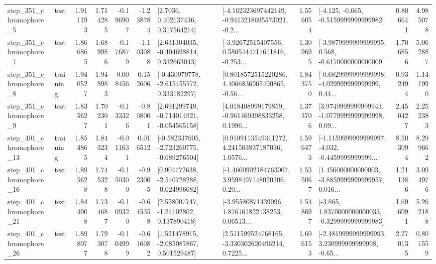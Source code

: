 \begin{tabular}{llrrrrllrlrr}
   step\_351\_chromophore\_5 &      test &      1.911193 &    1.714285 &     -0.196907 & -1.238784 &          [2.7036, 0.402137436, 0.317564214] &  [-4.162323697442149, -0.9413218695573021, -0.2... &       1.556054 &              [-4.125, -0.665, -0.5159999999999982] &            0.806641 &          4.985078 \\
   step\_351\_chromophore\_7 &      test &      1.866865 &    1.689986 &     -0.176879 & -1.103088 &    [2.631304035, -0.404698814, 0.332663043] &  [-3.92672515407556, 0.5805444717611816, -0.253... &       1.309695 &  [-3.9879999999999995, 0.568, -0.6170000000000009] &            1.706856 &          5.062887 \\
   step\_351\_chromophore\_8 &  training &      1.940527 &    1.948983 &      0.008456 &  0.152606 &   [-0.430979778, -2.615455572, 0.333182297] &  [0.8018572515220286, 4.4066836905490865, -0.56... &       1.843750 &  [-0.6829999999999998, -4.029999999999999, 0.44... &            0.932494 &          1.141990 \\
   step\_351\_chromophore\_9 &      test &      1.835627 &    1.702301 &     -0.133326 & -0.808001 &   [2.691299749, -0.714014921, -0.054565158] &  [4.018408999179859, -0.961469398833258, 0.1996... &       1.373706 &  [3.9749999999999943, -1.0779999999999998, 0.09... &            2.450427 &          2.252383 \\
  step\_401\_chromophore\_13 &  training &      1.854865 &    1.843234 &     -0.011631 &  0.016512 &  [-0.582337605, -2.723260775, -0.689276504] &  [0.9109113549311272, 4.241503837187036, 1.0576... &       1.596473 &  [-1.1159999999999997, -4.032, -0.4459999999999... &            8.503094 &          8.299662 \\
  step\_401\_chromophore\_16 &      test &      1.895628 &    1.745328 &     -0.150300 & -0.923005 &   [0.904772638, -2.540728288, -0.024996682] &  [-1.4600902184763007, 3.9598497148020306, 0.20... &       1.535067 &  [1.456000000000003, -3.8859999999999957, 0.016... &            1.211386 &          3.094976 \\
  step\_401\_chromophore\_21 &      test &      1.844008 &    1.734687 &     -0.109320 & -0.645358 &     [2.558007747, -1.24102802, 0.137890418] &  [-3.95580871439096, 1.876161822138253, 0.06513... &       1.548697 &  [-3.865, 1.8370000000000033, -0.3299999999999983] &            1.696091 &          5.262188 \\
  step\_401\_chromophore\_26 &      test &      1.898077 &    1.793078 &     -0.104999 & -0.616082 &    [1.521478915, -2.085087867, 0.501529487] &  [2.511599524768165, -3.330302620496214, 0.7225... &       1.606153 &  [-2.4819999999999993, 3.230999999999998, -0.65... &            2.270135 &          0.801559 \\

\end{tabular}
